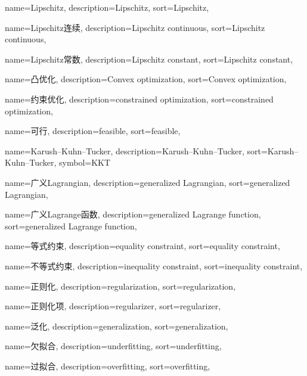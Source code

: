 {
  name=Lipschitz,
  description={Lipschitz},
  sort={Lipschitz},
}

{
  name=Lipschitz连续,
  description={Lipschitz continuous},
  sort={Lipschitz continuous},
}

{
  name=Lipschitz常数,
  description={Lipschitz constant},
  sort={Lipschitz constant},
}

{
  name=凸优化,
  description={Convex optimization},
  sort={Convex optimization},
}

{
  name=约束优化,
  description={constrained optimization},
  sort={constrained optimization},
}

{
  name=可行,
  description={feasible},
  sort={feasible},
}

{
  name=Karush–Kuhn–Tucker,
  description={Karush–Kuhn–Tucker},
  sort={Karush–Kuhn–Tucker},
  symbol={KKT}
}

{
  name=广义Lagrangian,
  description={generalized Lagrangian},
  sort={generalized Lagrangian},
}

{
  name=广义Lagrange函数,
  description={generalized Lagrange function},
  sort={generalized Lagrange function},
}

{
  name=等式约束,
  description={equality constraint},
  sort={equality constraint},
}

{
  name=不等式约束,
  description={inequality constraint},
  sort={inequality constraint},
}

{
  name=正则化,
  description={regularization},
  sort={regularization},
}

{
  name=正则化项,
  description={regularizer},
  sort={regularizer},
}

{
  name=泛化,
  description={generalization},
  sort={generalization},
}

{
  name=欠拟合,
  description={underfitting},
  sort={underfitting},
}

{
  name=过拟合,
  description={overfitting},
  sort={overfitting},
}

